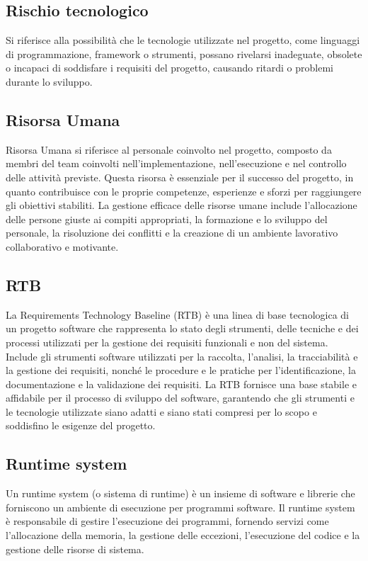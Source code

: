 \subsection*{Rischio tecnologico} 
Si riferisce alla possibilità che le tecnologie utilizzate nel progetto, come linguaggi di programmazione, framework o strumenti, possano rivelarsi inadeguate, obsolete o incapaci di soddisfare i requisiti del progetto, causando ritardi o problemi durante lo sviluppo.
\subsection*{Risorsa Umana} 
Risorsa Umana si riferisce al personale coinvolto nel progetto, composto da membri del team coinvolti nell'implementazione, nell'esecuzione e nel controllo delle attività previste. Questa risorsa è essenziale per il successo del progetto, in quanto contribuisce con le proprie competenze, esperienze e sforzi per raggiungere gli obiettivi stabiliti. La gestione efficace delle risorse umane include l'allocazione delle persone giuste ai compiti appropriati, la formazione e lo sviluppo del personale, la risoluzione dei conflitti e la creazione di un ambiente lavorativo collaborativo e motivante. 
\subsection*{RTB} 
La Requirements Technology Baseline (RTB) è una linea di base tecnologica di un progetto software che rappresenta lo stato degli strumenti, delle tecniche e dei processi utilizzati per la gestione dei requisiti funzionali e non del sistema. Include gli strumenti software utilizzati per la raccolta, l'analisi, la tracciabilità e la gestione dei requisiti, nonché le procedure e le pratiche per l'identificazione, la documentazione e la validazione dei requisiti. La RTB fornisce una base stabile e affidabile per il processo di sviluppo del software, garantendo che gli strumenti e le tecnologie utilizzate siano adatti e siano stati compresi per lo scopo e soddisfino le esigenze del progetto.
\subsection*{Runtime system} 
Un runtime system (o sistema di runtime) è un insieme di software e librerie che forniscono un ambiente di esecuzione per programmi software. Il runtime system è responsabile di gestire l'esecuzione dei programmi, fornendo servizi come l'allocazione della memoria, la gestione delle eccezioni, l'esecuzione del codice e la gestione delle risorse di sistema.
